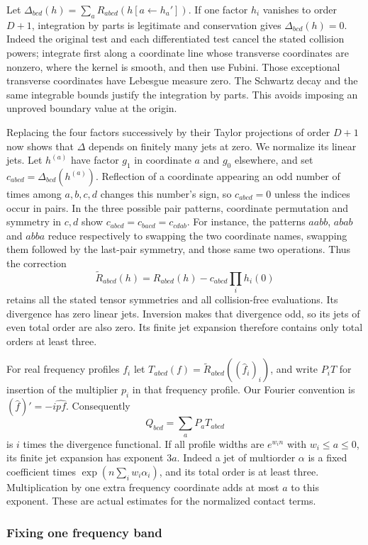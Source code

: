 Let $\Delta_{bcd}(h)=\sum_a R_{abcd}(h[a\leftarrow h_a'])$.
If one factor $h_i$ vanishes to order $D+1$, integration by parts is
legitimate and conservation gives $\Delta_{bcd}(h)=0$.
Indeed the original test and each differentiated test cancel the stated
collision powers; integrate first along a coordinate line whose transverse
coordinates are nonzero, where the kernel is smooth, and then use Fubini.
Those exceptional transverse coordinates have Lebesgue measure zero.
The Schwartz decay and the same integrable bounds justify the integration
by parts. This avoids imposing an unproved boundary value at the origin.

Replacing the four factors successively by their Taylor projections of
order $D+1$ now shows that $\Delta$ depends on finitely many jets at zero.
We normalize its linear jets. Let $h^{(a)}$ have factor $g_1$ in coordinate
$a$ and $g_0$ elsewhere, and set $c_{abcd}=\Delta_{bcd}(h^{(a)})$.
Reflection of a coordinate appearing an odd number of times among
$a,b,c,d$ changes this number's sign, so $c_{abcd}=0$ unless the indices
occur in pairs. In the three possible pair patterns, coordinate permutation
and symmetry in $c,d$ show
$c_{abcd}=c_{bacd}=c_{cdab}$. For instance, the patterns $aabb$, $abab$
and $abba$ reduce respectively to swapping the two coordinate names,
swapping them followed by the last-pair symmetry, and those same two
operations. Thus the correction
\[
 \widetilde R_{abcd}(h)=R_{abcd}(h)-c_{abcd}\prod_i h_i(0)
\]
retains all the stated tensor symmetries and all collision-free evaluations.
Its divergence has zero linear jets. Inversion makes that divergence odd,
so its jets of even total order are also zero. Its finite jet expansion
therefore contains only total orders at least three.

For real frequency profiles $f_i$ let
$T_{abcd}(f)=\widetilde R_{abcd}((\widehat f_i)_i)$, and write $P_iT$
for insertion of the multiplier $p_i$ in that frequency profile. Our
Fourier convention is $(\widehat f)'=-i\widehat{pf}$. Consequently
\[
 Q_{bcd}=\sum_a P_aT_{abcd}
\]
is $i$ times the divergence functional. If all profile widths are
$e^{w_in}$ with $w_i\leq a\leq0$, its finite jet expansion has exponent
$3a$. Indeed a jet of multiorder $\alpha$ is a fixed coefficient times
$\exp(n\sum_iw_i\alpha_i)$, and its total order is at least three.
Multiplication by one extra frequency coordinate adds at most $a$ to this
exponent. These are actual estimates for the normalized contact terms.

\subsubsection{Fixing one frequency band}

